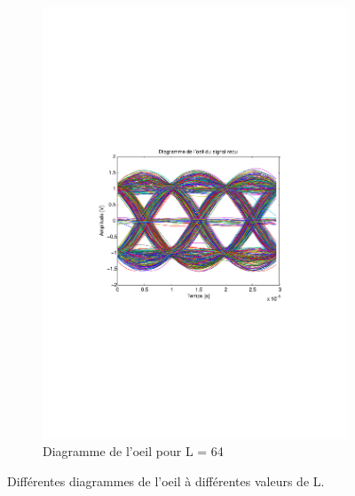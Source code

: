 \documentclass[a4paper,11pt]{article}
\begin{document}
\begin{figure}
\begin{subfigure}{.5\textwidth}
  		\includegraphics[width=1\linewidth]{Q10-L64.pdf}
  		\caption{Diagramme de l'oeil pour L = 64}
  		\label{fig:q10l64}
	\end{subfigure}
	\caption{Différentes diagrammes de l'oeil à différentes valeurs de L.}
	\label{fig:q10l}
\end{figure} 
\end{document}
